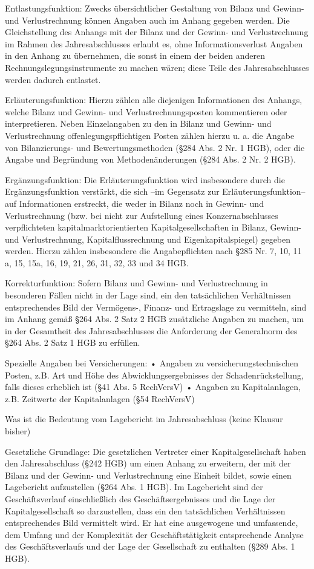 Entlastungsfunktion:
Zwecks übersichtlicher Gestaltung von Bilanz und Gewinn- und Verlustrechnung können Angaben auch im Anhang gegeben werden. 
Die Gleichstellung des Anhangs mit der Bilanz und der Gewinn- und Verlustrechnung im Rahmen des Jahresabschlusses erlaubt es, 
ohne Informationsverlust Angaben in den Anhang zu übernehmen,
die sonst in einem der beiden anderen Rechnungslegungsinstrumente zu machen wären; diese Teile des Jahresabschlusses werden dadurch entlastet.

Erläuterungsfunktion: 
Hierzu zählen alle diejenigen Informationen des Anhangs, welche Bilanz und Gewinn- und Verlustrechnungsposten kommentieren oder interpretieren. Neben
Einzelangaben zu den in Bilanz und Gewinn- und Verlustrechnung offenlegungspflichtigen Posten zählen hierzu u. a. die Angabe von Bilanzierungs- und
Bewertungsmethoden (§284 Abs. 2 Nr. 1 HGB), oder die Angabe und Begründung von Methodenänderungen (§284 Abs. 2 Nr. 2 HGB).

Ergänzungsfunktion: Die Erläuterungsfunktion wird insbesondere durch die Ergänzungsfunktion verstärkt, die sich –im Gegensatz zur Erläuterungsfunktion– auf Informationen erstreckt, die
weder in Bilanz noch in Gewinn- und Verlustrechnung (bzw. bei nicht zur Aufstellung eines Konzernabschlusses verpflichteten kapitalmarktorientierten
Kapitalgesellschaften in Bilanz, Gewinn- und Verlustrechnung, Kapitalflussrechnung und Eigenkapitalspiegel) gegeben werden. Hierzu zählen insbesondere die Angabepflichten nach §285 Nr. 7, 10, 11 a, 15, 15a, 16, 19, 21, 26, 31, 32, 33 und 34 HGB.

Korrekturfunktion: 
Sofern Bilanz und Gewinn- und Verlustrechnung in besonderen Fällen nicht in der Lage sind, ein den tatsächlichen Verhältnissen entsprechendes 
Bild der Vermögens-, Finanz- und Ertragslage zu vermitteln, sind im Anhang gemäß §264 Abs. 2 Satz 2 HGB zusätzliche Angaben zu machen, 
um in der Gesamtheit des Jahresabschlusses
die Anforderung der Generalnorm des §264 Abs. 2 Satz 1 HGB zu erfüllen.

Spezielle Angaben bei Versicherungen:
• Angaben zu versicherungstechnischen Posten, z.B. Art und Höhe des Abwicklungsergebnisses der Schadenrückstellung, falls dieses erheblich ist
(§41 Abs. 5 RechVersV)
• Angaben zu Kapitalanlagen, z.B. Zeitwerte der Kapitalanlagen (§54 RechVersV)

Was ist die Bedeutung vom Lagebericht im Jahresabschluss (keine Klausur bisher)

Gesetzliche Grundlage: 
Die gesetzlichen Vertreter einer Kapitalgesellschaft haben den Jahresabschluss (§242 HGB) um einen Anhang zu erweitern, 
der mit der Bilanz und der Gewinn- und Verlustrechnung eine Einheit bildet, sowie einen Lagebericht aufzustellen (§264 Abs. 1 HGB).
Im Lagebericht sind der Geschäftsverlauf einschließlich des Geschäftsergebnisses und die Lage der Kapitalgesellschaft so darzustellen, dass ein 
den tatsächlichen Verhältnissen entsprechendes Bild vermittelt wird. Er hat eine ausgewogene und umfassende, dem Umfang und der Komplexität der Geschäftstätigkeit entsprechende Analyse des Geschäftsverlaufs und der Lage der Gesellschaft zu enthalten (§289 Abs. 1 HGB).

